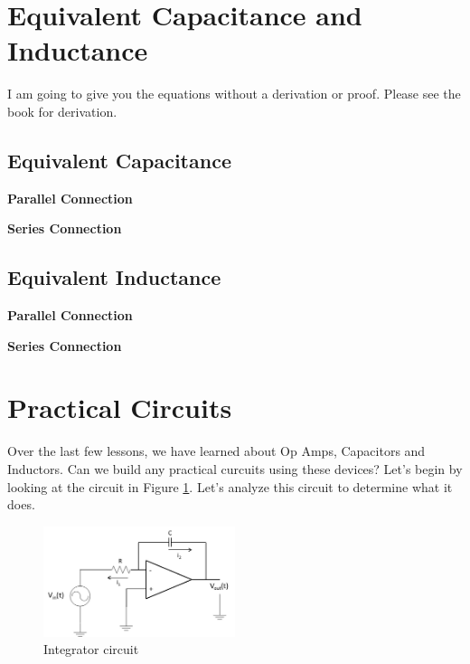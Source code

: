 \documentclass{handout}
\begin{document}
\newpage
\clearpage
\pagebreak

\section{Equivalent Capacitance and Inductance}
I am going to give you the equations without a derivation or proof.  Please see the book for derivation.

\subsection{Equivalent Capacitance}
\textbf{Parallel Connection}

\textbf{Series Connection}

\subsection{Equivalent Inductance}

\textbf{Parallel Connection}

\textbf{Series Connection}

\newpage
\clearpage
\pagebreak

\section{Practical Circuits}
Over the last few lessons, we have learned about Op Amps, Capacitors and Inductors.  Can we build any practical curcuits using these devices?  Let's begin by looking at the circuit in Figure \ref{fig: Integrator}.  Let's analyze this circuit to determine what it does.

\begin{figure} [h!]
\centering
\includegraphics[width=0.5\textwidth]{Integrator.jpg}
\caption{Integrator circuit}
\label{fig: Integrator}
\end{figure}
\end{document}
